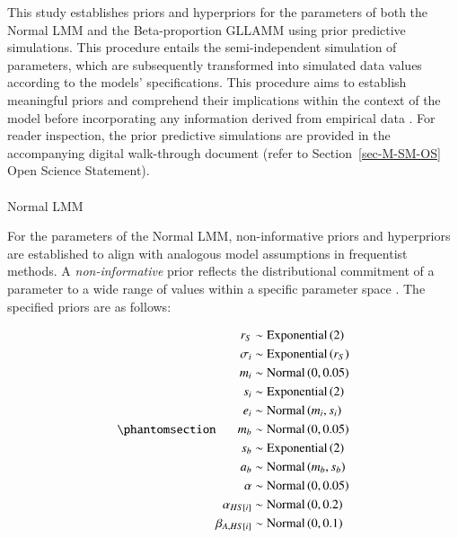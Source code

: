 \documentclass[
  authoryear,
  preprint,
  1p]{elsarticle}
\makeatletter
\let\oldparagraph\paragraph
\renewcommand{\paragraph}{
    \@ifstar
      \xxxParagraphStar
      \xxxParagraphNoStar
  }
\newcommand{\xxxParagraphStar}[1]{\oldparagraph*{#1}\mbox{}}
\newcommand{\xxxParagraphNoStar}[1]{\oldparagraph{#1}\mbox{}}
\makeatother
\begin{document}
This study establishes priors and hyperpriors for the parameters of both
the Normal LMM and the Beta-proportion GLLAMM using prior predictive
simulations. This procedure entails the semi-independent simulation of
parameters, which are subsequently transformed into simulated data
values according to the models' specifications. This procedure aims to
establish meaningful priors and comprehend their implications within the
context of the model before incorporating any information derived from
empirical data \citep{McElreath_2020}. For reader inspection, the prior
predictive simulations are provided in the accompanying digital
walk-through document (refer to Section~\ref{sec-M-SM-OS} Open Science
Statement).

\paragraph{Normal LMM}\label{sec-M-SM-P-NLMM}

For the parameters of the Normal LMM, non-informative priors and
hyperpriors are established to align with analogous model assumptions in
frequentist methods. A \emph{non-informative} prior reflects the
distributional commitment of a parameter to a wide range of values
within a specific parameter space \citep{Everitt_et_al_2010}. The
specified priors are as follows:

\begin{equation}\phantomsection\label{eq-normal-LMM-priors}{
\begin{aligned}
r_{S} &\sim \text{Exponential}\left( 2 \right) \\ 
\sigma_{i} &\sim \text{Exponential}\left( r_{S} \right) \\
m_{i} &\sim \text{Normal} \left( 0, 0.05 \right) \\
s_{i} &\sim \text{Exponential} \left( 2 \right) \\
e_{i} &\sim \text{Normal} \left( m_{i}, s_{i} \right) \\
m_{b} &\sim \text{Normal} \left( 0, 0.05 \right) \\
s_{b} &\sim \text{Exponential} \left( 2 \right) \\
a_{b} &\sim \text{Normal} \left( m_{b}, s_{b} \right) \\
\alpha &\sim \text{Normal} \left( 0, 0.05 \right) \\
\alpha_{HS[i]} &\sim \text{Normal} \left( 0, 0.2 \right) \\
\beta_{A,HS[i]} &\sim \text{Normal} \left( 0, 0.1 \right)
\end{aligned} 
}\end{equation}
\end{document}
